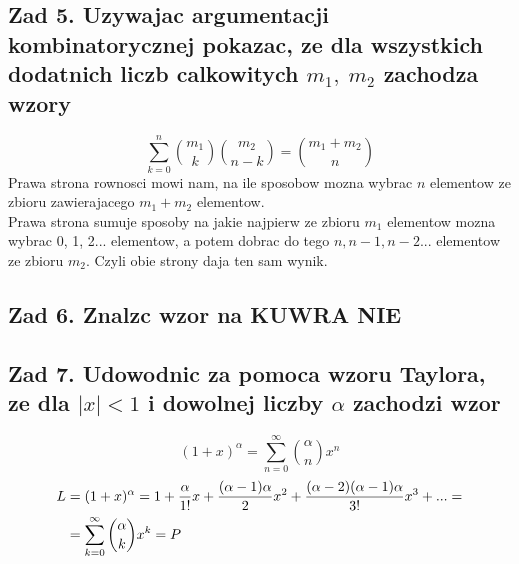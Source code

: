 \documentclass{article}
\begin{document}
\subsection*{Zad 5. Uzywajac argumentacji kombinatorycznej pokazac, ze dla wszystkich dodatnich liczb calkowitych $m_1,\;m_2$ zachodza wzory}
{\large\color{tit}$$\sum\limits_{k=0}^n{m_1\choose k}{m_2\choose n-k}={m_1+m_2\choose n}$$}
    Prawa strona rownosci mowi nam, na ile sposobow mozna wybrac $n$ elementow ze zbioru zawierajacego $m_1+m_2$ elementow.\smallskip\\
    Prawa strona sumuje sposoby na jakie najpierw ze zbioru $m_1$ elementow mozna wybrac 0, 1, 2... elementow, a potem dobrac do tego $n, n-1, n-2...$ elementow ze zbioru $m_2$. Czyli obie strony daja ten sam wynik.

\subsection*{Zad 6. Znalzc wzor na KUWRA NIE}
\subsection*{Zad 7. Udowodnic za pomoca wzoru Taylora, ze dla $|x|<1$ i dowolnej liczby $\alpha$ zachodzi wzor}
    {\color{tit}\large$$(1+x)^\alpha=\sum\limits_{n=0}^\infty{\alpha\choose n}x^n$$}
    \begin{align*}
        L&=(1+x)^\alpha=1+{\alpha\over1!}x+{(\alpha-1)\alpha\over2}x^2+{(\alpha-2)(\alpha-1)\alpha\over3!}x^3+...=\\
        &=\sum\limits_{k=0}^\infty{\alpha\choose k}x^k=P
    \end{align*}
\end{document}
